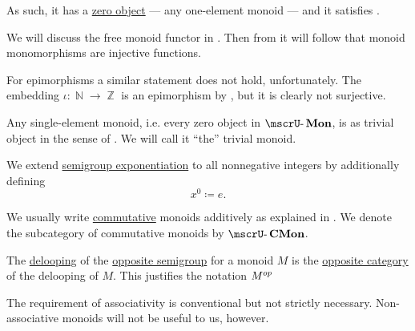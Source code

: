 \begin{definition}
\begin{thmenum}
    As such, it has a \hyperref[def:universal_objects/zero]{zero object} --- any one-element monoid --- and it satisfies .

    We will discuss the free monoid functor in . Then from  it will follow that monoid monomorphisms are injective functions.

    For epimorphisms a similar statement does not hold, unfortunately. The embedding \( \iota: \BbbN \to \BbbZ \) is an epimorphism by , but it is clearly not surjective.

     Any single-element monoid, i.e. every zero object in \( \ucat{Mon} \), is as trivial object in the sense of . We will call it \enquote{the} trivial monoid.

     We extend \hyperref[def:semigroup/exponentiation]{semigroup exponentiation} to all nonnegative integers by additionally defining
    \begin{equation*}
      x^0 \coloneqq e.
    \end{equation*}

     We usually write \hyperref[def:binary_operation/commutative]{commutative} monoids additively as explained in . We denote the subcategory of commutative monoids by \( \ucat{CMon} \).

     The \hyperref[def:monoid_delooping]{delooping} of the \hyperref[def:semigroup/opposite]{opposite semigroup} for a monoid \( M \) is the \hyperref[def:opposite_category]{opposite category} of the delooping of \( M \). This justifies the notation \( M^{op} \)
  \end{thmenum}
\end{definition}
\begin{comments}
  \item The requirement of associativity is conventional but not strictly necessary. Non-associative monoids will not be useful to us, however.
\end{comments}

